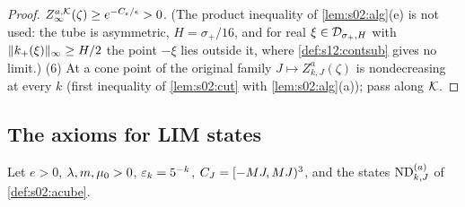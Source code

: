 \begin{proof}
$Z^{a,\mathcal K}_\infty(\zeta)\ge e^{-C_\epsilon/\epsilon}>0$. (The product inequality of \cref{lem:s02:alg}(e) is not used: the tube is asymmetric, $H=\sigma_+/16$, and for real $\xi\in\mathcal D_{\sigma_+,H}$ with $\lVert k_+(\xi)\rVert_\infty\ge H/2$ the point $-\xi$ lies outside it, where \cref{def:s12:contsub} gives no limit.) (6) At a cone point of the original family $J\mapsto Z^a_{k,J}(\zeta)$ is nondecreasing at every $k$ (first inequality of \cref{lem:s02:cut} with \cref{lem:s02:alg}(a)); pass along $\mathcal K$.
\end{proof}

\subsection{The axioms for LIM states}

\begin{theorem}\label{thm:s12:LIM}
Let $e>0$, $\lambda,m,\mu_0>0$, $\varepsilon_k=5^{-k}$, $C_J=[-MJ,MJ)^3$, and the states $\mathrm{ND}^{(a)}_{k,J}$ of \cref{def:s02:acube}.


\end{theorem}
